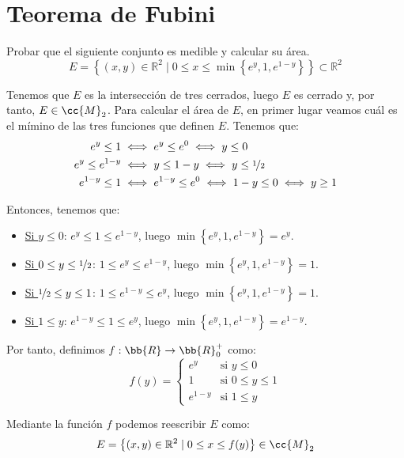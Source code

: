 \section{Teorema de Fubini}

\begin{ejercicio}
    Probar que el siguiente conjunto es medible y calcular su área.
    \[ E = \left\{ (x, y) \in \mathbb{R}^2 \mid 0 \leq x \leq \min \left\{ e^y , 1 , e^{1-y} \right\} \right\} \subset \mathbb{R}^2 \]

    Tenemos que $E$ es la intersección de tres cerrados, luego $E$ es cerrado y, por tanto, $E\in \cc{M}_2$.
    Para calcular el área de $E$, en primer lugar veamos cuál es el mímino de las tres funciones que definen $E$.
    Tenemos que:
    \begin{align*}
        e^y \leq 1 &\iff e^y \leq e^0 \iff y \leq 0 \\
        e^y \leq e^{1-y} &\iff y \leq 1-y \iff y \leq \nicefrac{1}{2} \\
        e^{1-y} \leq 1 &\iff e^{1-y} \leq e^0 \iff 1-y \leq 0 \iff y \geq 1
    \end{align*}

    Entonces, tenemos que:
    \begin{itemize}
        \item \ul{Si $y \leq 0$}: $e^y \leq 1\leq e^{1-y}$, luego $\min \left\{ e^y , 1 , e^{1-y} \right\} = e^y$.
        \item \ul{Si $0 \leq y \leq \nicefrac{1}{2}$}: $1\leq e^y \leq e^{1-y}$, luego $\min \left\{ e^y , 1 , e^{1-y} \right\} = 1$.
        \item \ul{Si $\nicefrac{1}{2} \leq y \leq 1$}: $1\leq e^{1-y} \leq e^y$, luego $\min \left\{ e^y , 1 , e^{1-y} \right\} = 1$.
        \item \ul{Si $1\leq y$}: $e^{1-y}\leq 1 \leq e^{y}$, luego $\min \left\{ e^y , 1 , e^{1-y} \right\} = e^{1-y}$.
    \end{itemize}

    Por tanto, definimos $f:\bb{R} \to \bb{R}_0^+$ como:
    \[ f(y) = \begin{cases}
        e^y & \text{si } y \leq 0 \\
        1 & \text{si } 0 \leq y \leq 1 \\
        e^{1-y} & \text{si } 1 \leq y
    \end{cases} \]

    Mediante la función $f$ podemos reescribir $E$ como:
    \[ E = \left\{ (x, y) \in \mathbb{R}^2 \mid 0 \leq x \leq f(y) \right\}\in \cc{M}_2 \]


\end{ejercicio}
